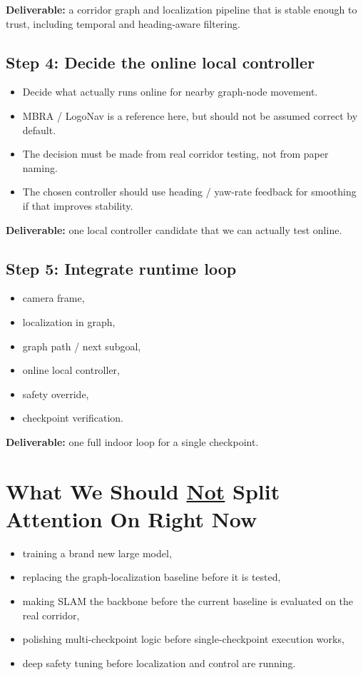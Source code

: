 \documentclass[11pt,a4paper]{article}
\begin{document}
\textbf{Deliverable:} a corridor graph and localization pipeline that is stable enough to trust, including temporal and heading-aware filtering.

\subsection*{Step 4: Decide the online local controller}

\begin{itemize}[nosep]
  \item Decide what actually runs online for nearby graph-node movement.
  \item MBRA / LogoNav is a reference here, but should not be assumed correct by default.
  \item The decision must be made from real corridor testing, not from paper naming.
  \item The chosen controller should use heading / yaw-rate feedback for smoothing if that improves stability.
\end{itemize}

\textbf{Deliverable:} one local controller candidate that we can actually test online.

\subsection*{Step 5: Integrate runtime loop}

\begin{itemize}[nosep]
  \item camera frame,
  \item localization in graph,
  \item graph path / next subgoal,
  \item online local controller,
  \item safety override,
  \item checkpoint verification.
\end{itemize}

\textbf{Deliverable:} one full indoor loop for a single checkpoint.


\section{What We Should \underline{Not} Split Attention On Right Now}

\begin{itemize}[nosep]
  \item training a brand new large model,
  \item replacing the graph-localization baseline before it is tested,
  \item making SLAM the backbone before the current baseline is evaluated on the real corridor,
  \item polishing multi-checkpoint logic before single-checkpoint execution works,
  \item deep safety tuning before localization and control are running.
\end{itemize}
\end{document}
